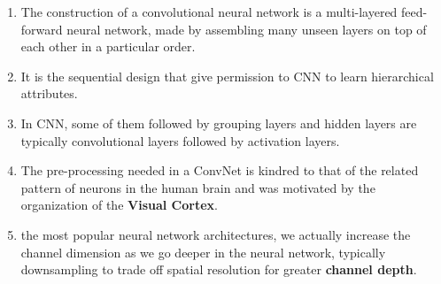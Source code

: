 \begin{enumerate}
    \item The construction of a convolutional neural network is a multi-layered feed-forward neural network, made by assembling many unseen layers on top of each other in a particular order.

    \item It is the sequential design that give permission to CNN to learn hierarchical attributes.
    
    \item In CNN, some of them followed by grouping layers and hidden layers are typically convolutional layers followed by activation layers.
    
    \item The pre-processing needed in a ConvNet is kindred to that of the related pattern of neurons in the human brain and was motivated by the organization of the \textbf{Visual Cortex}.

    \item  the most popular neural network architectures, we actually increase the channel dimension as we go deeper in the neural network, typically downsampling to trade off spatial resolution for greater \textbf{channel depth}.
\end{enumerate}







